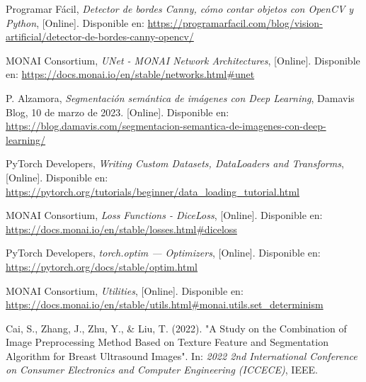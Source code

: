 \documentclass[12pt]{article}
\begin{document}
\begin{thebibliography}{9}
Programar Fácil, \textit{Detector de bordes Canny, cómo contar objetos con OpenCV y Python}, [Online]. Disponible en: \url{https://programarfacil.com/blog/vision-artificial/detector-de-bordes-canny-opencv/}

MONAI Consortium, \textit{UNet - MONAI Network Architectures}, [Online]. Disponible en: \url{https://docs.monai.io/en/stable/networks.html#unet}

P. Alzamora, \textit{Segmentación semántica de imágenes con Deep Learning}, Damavis Blog, 10 de marzo de 2023. [Online]. Disponible en: \url{https://blog.damavis.com/segmentacion-semantica-de-imagenes-con-deep-learning/}

PyTorch Developers, \textit{Writing Custom Datasets, DataLoaders and Transforms}, [Online]. Disponible en: \url{https://pytorch.org/tutorials/beginner/data_loading_tutorial.html}

MONAI Consortium, \textit{Loss Functions - DiceLoss}, [Online]. Disponible en: \url{https://docs.monai.io/en/stable/losses.html#diceloss}

PyTorch Developers, \textit{torch.optim — Optimizers}, [Online]. Disponible en: \url{https://pytorch.org/docs/stable/optim.html}

MONAI Consortium, \textit{Utilities}, [Online]. Disponible en: \url{https://docs.monai.io/en/stable/utils.html#monai.utils.set_determinism}

Cai, S., Zhang, J., Zhu, Y., \& Liu, T. (2022). "A Study on the Combination of Image Preprocessing Method Based on Texture Feature and Segmentation Algorithm for Breast Ultrasound Images". In: \textit{2022 2nd International Conference on Consumer Electronics and Computer Engineering (ICCECE)}, IEEE.



\end{thebibliography}
\end{document}
